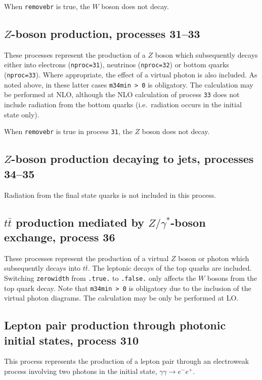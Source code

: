 When {\tt removebr} is true, the $W$ boson does not decay.

\subsection{$Z$-boson production, processes 31--33}
\label{subsec:zboson}

These processes represent the production of a $Z$ boson which subsequently
decays either into electrons ({\tt nproc=31}), neutrinos ({\tt nproc=32})
or bottom quarks ({\tt nproc=33}). Where appropriate, the effect of a virtual
photon is also included. As noted above, in these latter cases {\tt m34min > 0}
is obligatory. The calculation may be performed at NLO,
although the NLO calculation of process {\tt 33} does not include radiation
from the bottom quarks (i.e.\ radiation occurs in the initial state only).

When {\tt removebr} is true in process {\tt 31}, the $Z$ boson does not decay.

\subsection{$Z$-boson production decaying to jets, processes 34--35}
Radiation from the final state quarks is not included in this process.

\subsection{$t \bar{t}$ production mediated by $Z/\gamma^*$-boson exchange, process 36}

These processes represent the production of a virtual $Z$ boson or photon 
which subsequently decays into $t \bar{t}$.
The leptonic decays of the top quarks are included.
Switching {\tt zerowidth} from {\tt .true.} to {\tt .false.} only affects
the $W$ bosons from the top quark decay.
Note that {\tt m34min > 0} is obligatory due to the inclusion of the
virtual photon diagrams. The calculation may be only be performed at LO.

\subsection{Lepton pair production through photonic initial states, process 310}
\label{subsec:gg2lep}

This process represents the production of a lepton pair through an electroweak
process involving two photons in the initial state, $\gamma\gamma \to e^- e^+$.


